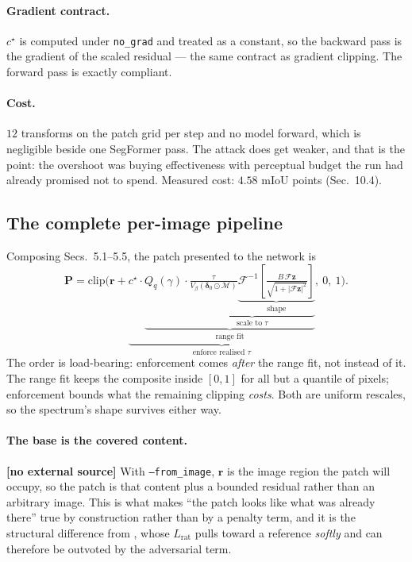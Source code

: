 \documentclass[11pt,a4paper]{article}
\newcommand{\novel}{\textbf{[no external source]}}
\begin{document}
\paragraph{Gradient contract.}
$c^\star$ is computed under \texttt{no\_grad} and treated as a constant, so
the backward pass is the gradient of the scaled residual --- the same
contract as gradient clipping. The forward pass is exactly compliant.

\paragraph{Cost.}
$12$ transforms on the patch grid per step and no model forward, which is
negligible beside one SegFormer pass. The attack does get weaker, and that
is the point: the overshoot was buying effectiveness with perceptual budget
the run had already promised not to spend. Measured cost: $4.58$ mIoU
points (Sec.~10.4).

\subsection{The complete per-image pipeline}

Composing Secs.~5.1--5.5, the patch presented to the network is
\begin{equation}
  \mathbf{P} = \mathrm{clip}\Big(\mathbf{r} +
    \underbrace{c^\star\cdot
      \underbrace{Q_q(\gamma)\cdot
        \underbrace{\tfrac{\tau}{V_\beta(\boldsymbol{\delta}_0\odot\mathcal{M})}
          \underbrace{\mathcal{F}^{-1}\!\left[
            \tfrac{B\,\mathcal{F}\mathbf{z}}
                  {\sqrt{1+|\mathcal{F}\mathbf{z}|^2}}\right]}
            _{\text{shape}}}_{\text{scale to }\tau}}
      _{\text{range fit}}}_{\text{enforce realised }\tau},\ 0,\ 1\Big).
  \label{eq:pipeline}
\end{equation}
The order is load-bearing: enforcement comes \emph{after} the range fit, not
instead of it. The range fit keeps the composite inside $[0,1]$ for all but a
quantile of pixels; enforcement bounds what the remaining clipping
\emph{costs}. Both are uniform rescales, so the spectrum's shape survives
either way.

\paragraph{The base is the covered content.} \novel{}
With \texttt{--from\_image}, $\mathbf{r}$ is the image region the patch will
occupy, so the patch is that content plus a bounded residual rather than an
arbitrary image. This is what makes ``the patch looks like what was already
there'' true by construction rather than by a penalty term, and it is the
structural difference from \citet{tan2021lap}, whose $L_{\mathrm{rat}}$ pulls
toward a reference \emph{softly} and can therefore be outvoted by the
adversarial term.
\end{document}
